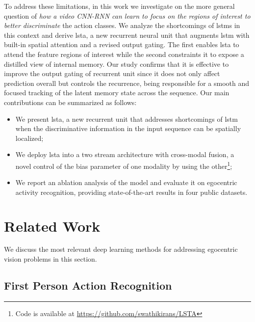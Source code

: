 \documentclass[10pt,twocolumn,letterpaper]{article}
\begin{document}
To address these limitations, in this work we investigate on the more general question of \emph{how a video CNN-RNN can learn to focus on the regions of interest to better discriminate} the action classes. We analyze the shortcomings of \acsp{lstm} in this context and derive \ac{lsta}, a new recurrent neural unit that augments \acs{lstm} with built-in spatial attention and a revised output gating. The first enables \ac{lsta} to attend the feature regions of interest while the second constraints it to expose a distilled view of internal memory. Our study confirms that it is effective to improve the output gating of recurrent unit since it does not only affect prediction overall but controls the recurrence, being responsible for a smooth and focused tracking of the latent memory state across the sequence. Our main contributions can be summarized as follows:
\begin{itemize}
    \item We present \acf{lsta}, a new recurrent unit that addresses shortcomings of \acs{lstm} when the discriminative information in the input sequence can be spatially localized;\vspace{-0.2cm}
    \item We deploy \ac{lsta} into a two stream architecture with cross-modal fusion, a novel control of the bias parameter of one modality by using the other\footnote{Code is available at \href{https://github.com/swathikirans/LSTA}{https://github.com/swathikirans/LSTA}};\vspace{-0.2cm}
    \item We report an ablation analysis of the model and evaluate it on egocentric activity recognition, providing state-of-the-art results in four public datasets.
\end{itemize}











\section{Related Work}
\label{sec:related}
We discuss the most relevant deep learning methods for addressing egocentric vision problems in this section.


\subsection{First Person Action Recognition}
\end{document}
